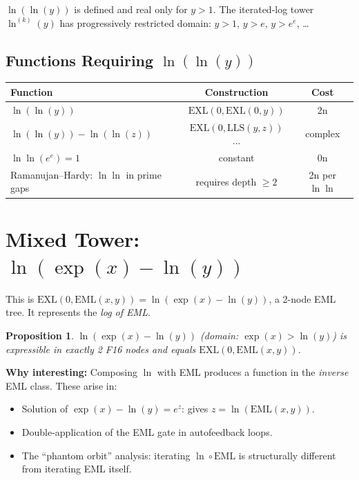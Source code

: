\documentclass[11pt]{article}
\newtheorem{proposition}[theorem]{Proposition}
\begin{document}
$\ln(\ln(y))$ is defined and real only for $y > 1$.
The iterated-log tower $\ln^{(k)}(y)$ has progressively restricted domain:
$y > 1$, $y > e$, $y > e^e$, \ldots

\subsection{Functions Requiring $\ln(\ln(y))$}

\begin{center}
\begin{tabular}{lcc}
\toprule
Function & Construction & Cost \\
\midrule
$\ln(\ln(y))$ & $\mathrm{EXL}(0,\mathrm{EXL}(0,y))$ & 2n \\
$\ln(\ln(y)) - \ln(\ln(z))$ & $\mathrm{EXL}(0,\mathrm{LLS}(y,z))$... & complex \\
$\ln\ln(e^e) = 1$ & constant & 0n \\
Ramanujan--Hardy: $\ln\ln$ in prime gaps & requires depth $\geq 2$ & 2n per $\ln\ln$ \\
\bottomrule
\end{tabular}
\end{center}

\section{Mixed Tower: $\ln(\exp(x) - \ln(y))$}
\label{sec:mixed}

This is $\mathrm{EXL}(0, \mathrm{EML}(x,y)) = \ln(\exp(x) - \ln(y))$,
a 2-node EML tree. It represents the \emph{log of EML}.

\begin{proposition}
$\ln(\exp(x) - \ln(y))$ (domain: $\exp(x) > \ln(y)$) is expressible in exactly
2 F16 nodes and equals $\mathrm{EXL}(0, \mathrm{EML}(x,y))$.
\end{proposition}

\noindent \textbf{Why interesting:} Composing $\ln$ with EML produces a
function in the \emph{inverse} EML class. These arise in:
\begin{itemize}
  \item Solution of $\exp(x) - \ln(y) = e^z$: gives $z = \ln(\mathrm{EML}(x,y))$.
  \item Double-application of the EML gate in autofeedback loops.
  \item The ``phantom orbit'' analysis: iterating $\ln \circ \mathrm{EML}$ is
        structurally different from iterating EML itself.
\end{itemize}
\end{document}
